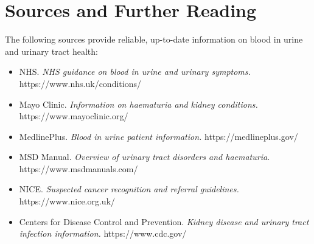 \section*{Sources and Further Reading}
The following sources provide reliable, up-to-date information on blood in urine and urinary tract health:

\begin{itemize}
    \item NHS. \textit{NHS guidance on blood in urine and urinary symptoms.} https://www.nhs.uk/conditions/
    \item Mayo Clinic. \textit{Information on haematuria and kidney conditions.} https://www.mayoclinic.org/
    \item MedlinePlus. \textit{Blood in urine patient information.} https://medlineplus.gov/
    \item MSD Manual. \textit{Overview of urinary tract disorders and haematuria.} https://www.msdmanuals.com/
    \item NICE. \textit{Suspected cancer recognition and referral guidelines.} https://www.nice.org.uk/
    \item Centers for Disease Control and Prevention. \textit{Kidney disease and urinary tract infection information.} https://www.cdc.gov/
\end{itemize}
